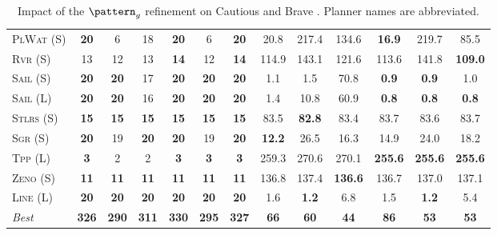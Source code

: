 \documentclass[11pt,landscape]{article}
\begin{document}
\begin{table}[tb]
{\begin{tabular}{|l||cccccc||cccccc||}
\textsc{PlWat} (S)&\textbf{20}&6&18&\textbf{20}&6&\textbf{20}&20.8&217.4&134.6&\textbf{16.9}&219.7&85.5\\
\textsc{Rvr} (S)&13&12&13&\textbf{14}&12&\textbf{14}&114.9&143.1&121.6&113.6&141.8&\textbf{109.0}\\
\textsc{Sail} (S)&\textbf{20}&\textbf{20}&17&\textbf{20}&\textbf{20}&\textbf{20}&1.1&1.5&70.8&\textbf{0.9}&\textbf{0.9}&1.0\\
\textsc{Sail} (L)&\textbf{20}&\textbf{20}&16&\textbf{20}&\textbf{20}&\textbf{20}&1.4&10.8&60.9&\textbf{0.8}&\textbf{0.8}&\textbf{0.8}\\
\textsc{Stlrs} (S)&\textbf{15}&\textbf{15}&\textbf{15}&\textbf{15}&\textbf{15}&\textbf{15}&83.5&\textbf{82.8}&83.4&83.7&83.6&83.7\\
\textsc{Sgr} (S)&\textbf{20}&19&\textbf{20}&\textbf{20}&19&\textbf{20}&\textbf{12.2}&26.5&16.3&14.9&24.0&18.2\\
\textsc{Tpp} (L)&\textbf{3}&2&2&\textbf{3}&\textbf{3}&\textbf{3}&259.3&270.6&270.1&\textbf{255.6}&\textbf{255.6}&\textbf{255.6}\\
\textsc{Zeno} (S)&\textbf{11}&\textbf{11}&\textbf{11}&\textbf{11}&\textbf{11}&\textbf{11}&136.8&137.4&\textbf{136.6}&136.7&137.0&137.1\\
\textsc{Line} (L)&\textbf{20}&\textbf{20}&\textbf{20}&\textbf{20}&\textbf{20}&\textbf{20}&1.6&\textbf{1.2}&6.8&1.5&\textbf{1.2}&5.4
\\\hline
\textit{Best}&\textbf{326}&\textbf{290}&\textbf{311}&\textbf{330}&\textbf{295}&\textbf{327}&\textbf{66}&\textbf{60}&\textbf{44}&\textbf{86}&\textbf{53}&\textbf{53}\\\hline

        \end{tabular}}
        \caption{Impact of the $\pattern_g$ refinement on Cautious and Brave \pattyd. Planner names are abbreviated.}
        \label{tab:abl-patterng}
        \end{table}
        
\end{document}
